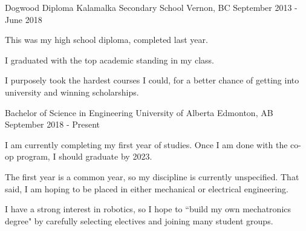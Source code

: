 

\begin{cventries}

  \cventry
    {Dogwood Diploma} %
    {Kalamalka Secondary School} %
    {Vernon, BC} %
    {September 2013 - June 2018} %
    {
      \begin{cvitems} %
        \item {This was my high school diploma, completed last year.}
        \item {I graduated with the top academic standing in my class.}
        \item {I purposely took the hardest courses I could, for a better chance of getting into university and winning scholarships.}
      \end{cvitems}
    }

  \cventry
    {Bachelor of Science in Engineering}
    {University of Alberta}
    {Edmonton, AB}
    {September 2018 - Present}
    {
      \begin{cvitems}
        \item {I am currently completing my first year of studies. Once I am done with the co-op program, I should graduate by 2023.}
        \item {The first year is a common year, so my discipline is currently unspecified. That said, I am hoping to be placed in either mechanical or electrical engineering.}
        \item {I have a strong interest in robotics, so I hope to ``build my own mechatronics degree" by carefully selecting electives and joining many student groups.}
      \end{cvitems}
    }

\end{cventries}
